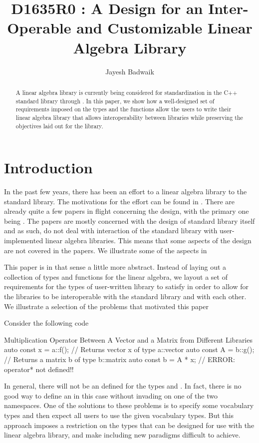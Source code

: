 \documentclass[oneside,11pt,a4paper]{jbarticle}
\subtitle{}
\title{D1635R0 : A Design for an Inter-Operable and Customizable Linear Algebra Library}
\author{Jayesh Badwaik}
\begin{document}
\maketitle[\value{page}]
\begin{abstract}
  A linear algebra library is currently being considered for standardization in
  the C++ standard library through \cite{GuyDavidson2019}.
  In this paper, we show how a well-designed set of requirements imposed on the
  types and the functions allow the users to write their linear algebra library
  that allows interoperability between libraries while preserving the objectives
  laid out for the library.
\end{abstract}

\section{Introduction}

In the past few years, there has been an effort to a linear algebra library to
the standard library. The motivations for the effort can be found in
\cite{GuyDavidson2019a}. There are already quite a few papers in flight
concerning the design, with the primary one being \cite{GuyDavidson2019}. The
papers are mostly concerned with the design of standard library itself and as
such, do not deal with interaction of the standard library with user-implemented
linear algebra libraries.  This means that some aspects of the design are not
covered in the papers. We illustrate some of the aspects in

This paper is in that sense a little more abstract. Instead of laying out a
collection of types and functions for the linear algebra, we layout a set of
requirements for the types of user-written library to satisfy in order to allow
for the libraries to be interoperable with the standard library and with each
other. We illustrate a selection of the problems that motivated this paper


Consider the following code
\begin{codecpp}{Multiplication Operator Between A Vector and a Matrix from
  Different Libraries}
  auto const x = a::f();  // Returns vector x of type a::vector
  auto const A = b::g();  // Returns a matrix b of type b::matrix
  auto const b = A * x;   // ERROR: operator* not defined!!
\end{codecpp}
In general, there will not be an  defined for the types
 and . In fact, there is no good way
to define an  in this case without invading on one of the
two namespaces.  One of the solutions to these problems is to specify some
vocabulary types and then expect all users to use the given vocabulary types.
But this approach imposes a restriction on the types that can be designed for
use with the linear algebra library, and make including new paradigms difficult
to achieve.
\end{document}
